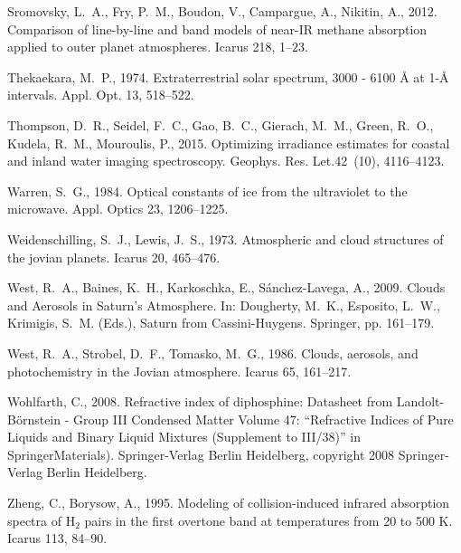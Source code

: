 \documentclass[article,11pt]{emulateapj}
\def\grl{Geophys. Res. Let.}
\begin{document}
\begin{thebibliography}{85}
{Sromovsky}, L.~A., {Fry}, P.~M., {Boudon}, V., {Campargue}, A., {Nikitin}, A.,
  2012. {Comparison of line-by-line and band models of near-IR methane
  absorption applied to outer planet atmospheres}. Icarus 218, 1--23.

{Thekaekara}, M.~P., 1974. {Extraterrestrial solar spectrum, 3000 - 6100 {\AA}
  at 1-{\AA} intervals.} Appl. Opt. 13, 518--522.

{Thompson}, D.~R., {Seidel}, F.~C., {Gao}, B.~C., {Gierach}, M.~M., {Green},
  R.~O., {Kudela}, R.~M., {Mouroulis}, P., 2015. {Optimizing irradiance
  estimates for coastal and inland water imaging spectroscopy}. \grl 42~(10),
  4116--4123.

{Warren}, S.~G., 1984. {Optical constants of ice from the ultraviolet to the
  microwave}. Appl. Optics 23, 1206--1225.

{Weidenschilling}, S.~J., {Lewis}, J.~S., 1973. {Atmospheric and cloud
  structures of the jovian planets}. Icarus 20, 465--476.

{West}, R.~A., {Baines}, K.~H., {Karkoschka}, E., {S{\'a}nchez-Lavega}, A.,
  2009. {Clouds and Aerosols in Saturn's Atmosphere}. In: Dougherty, M.~K.,
  Esposito, L.~W., Krimigis, S.~M. (Eds.), {Saturn from Cassini-Huygens}.
  {Springer}, pp. 161--179.

{West}, R.~A., {Strobel}, D.~F., {Tomasko}, M.~G., 1986. {Clouds, aerosols, and
  photochemistry in the Jovian atmosphere}. Icarus 65, 161--217.

Wohlfarth, C., 2008. Refractive index of diphosphine: Datasheet from
  Landolt-B{\"o}rnstein - Group III Condensed Matter {\textperiodcentered}
  Volume 47: ``Refractive Indices of Pure Liquids and Binary Liquid Mixtures
  (Supplement to III/38)'' in SpringerMaterials). Springer-Verlag Berlin
  Heidelberg, copyright 2008 Springer-Verlag Berlin Heidelberg.

{Zheng}, C., {Borysow}, A., 1995. {Modeling of collision-induced infrared
  absorption spectra of H$_2$ pairs in the first overtone band at temperatures
  from 20 to 500 K}. Icarus 113, 84--90.

\end{thebibliography}
\end{document}
